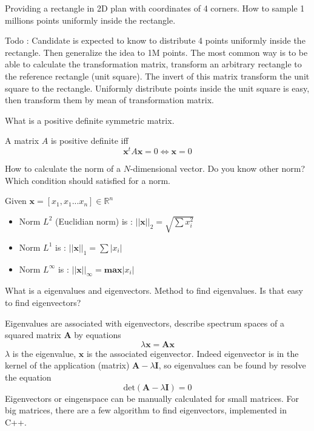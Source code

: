 \documentclass[answers]{exam}
\newcommand{\mathvec}[1]{\textbf{#1}}
\begin{document}
\begin{questions}
\question Providing a rectangle in 2D plan with coordinates of 4 corners. How to sample 1 millions points uniformly inside the rectangle.
\begin{solution}[.2in]
Todo : Candidate is expected to know to distribute 4 points uniformly inside the rectangle. Then generalize the idea to 1M points. The most common way is to be able to calculate the transformation matrix, transform an arbitrary rectangle to the reference rectangle (unit square). The invert of this matrix transform the unit square to the rectangle. Uniformly distribute points inside the unit square is easy, then transform them by mean of transformation matrix.
\end{solution}

\question What is a positive definite symmetric matrix.
\begin{solution}[.2in]
A matrix $A$ is positive definite iff 
\[
\mathvec{x}^t A \mathvec{x} = 0 \Longleftrightarrow \mathvec{x}=0
\]
\end{solution}

\question How to calculate the norm of a $N$-dimensional vector. Do you know other norm? Which condition should satisfied for a norm.
\begin{solution}[.2in]
Given $\mathvec{x}=[x_1,x_1 ... x_n] \in \mathbb{R}^n$
\begin{itemize}
	\item Norm $L^2$ (Euclidian norm) is : $||\textbf{x}||_{2} = \sqrt{\sum x^2_i} $
	\item Norm $L^1$ is : $||\textbf{x}||_{1} = \sum |x_i|$
	\item Norm $L^\infty$ is : $||\textbf{x}||_{\infty} = \textbf{max} |x_i|$
\end{itemize}
\end{solution}

\question What is a eigenvalues and eigenvectors. Method to find eigenvalues. Is that easy to find eigenvectors?
\begin{solution}[.2in]
Eigenvalues are associated with eigenvectors, describe spectrum spaces of a squared matrix $\mathvec{A}$ by equations 
\[
\lambda\mathvec{x} = \mathvec{A}\mathvec{x}
\]
$\lambda$ is the eigenvalue, $\mathvec{x}$ is the associated eigenvector. Indeed eigenvector is in the kernel of the application (matrix) $\mathvec{A}-\lambda\mathvec{I}$, so eigenvalues can be found by resolve the equation
\[
\text{det}(\mathvec{A}-\lambda\mathvec{I})=0
\]
Eigenvectors or eingenspace can be manually calculated for small matrices. For big matrices, there are a few algorithm to find eigenvectors, implemented in C++.
\end{solution}


\end{questions}
\end{document}
